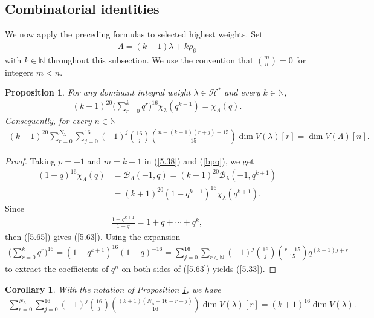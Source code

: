 \documentclass[12pt]{article}
\numberwithin{equation}{section}
\newtheorem{corollary}[theorem]{Corollary}
\newtheorem{proposition}[theorem]{Proposition}
\theoremstyle{definition}
\theoremstyle{remark}
\begin{document}
\subsection{Combinatorial identities}
We now apply the preceding formulas to selected highest weights. Set
\begin{eqnarray}
	\Lambda=(k+1)\lambda+k\rho_6
\end{eqnarray}
with $k\in\mathbb{N}$ throughout this subsection. We use the convention that $\binom{m}{n}=0$ for integers $m<n$.
\begin{proposition}\label{prop5.6}
	For any dominant integral weight $\lambda\in \mathscr{H}^*$ and every $k\in\mathbb{N}$, 
	\begin{eqnarray}
		(k+1)^{20}\big(\sum_{r=0}^kq^r\big)^{16}\chi_\lambda(q^{k+1})=\chi_{\Lambda}(q).\label{5.63}
	\end{eqnarray}
	Consequently, for every $n\in\mathbb{N}$
	\begin{align}
		(k+1)^{20}\sum_{r=0}^{N_{\lambda}}\sum\limits_{j=0}^{16}(-1)^j\binom{16}{j}\binom{n-(k+1)(r+j)+15}{15}\dim V(\lambda)[r]=\dim V(\Lambda)[n].\label{5.33}
	\end{align}
\end{proposition}
\begin{proof}
	Taking $p=-1$ and $m=k+1$ in (\ref{5.38}) and (\ref{bpq}), we get
	\begin{align}
		(1-q)^{16}\chi_{\Lambda}(q)&=\mathcal{B}_{\Lambda}(-1,q)=(k+1)^{20}\mathcal{B}_{\lambda}(-1,q^{k+1})\nonumber\\
		&=(k+1)^{20}(1-q^{k+1})^{16}\chi_{\lambda}(q^{k+1}).\label{5.65}
	\end{align}
	Since 
	\begin{eqnarray}
		\frac{1-q^{k+1}}{1-q}=1+q+\cdots +q^k,
	\end{eqnarray}
	then (\ref{5.65}) gives (\ref{5.63}). Using the expansion
	\begin{align}
		\big(\sum_{r=0}^{k}q^r\big)^{16}=(1-q^{k+1})^{16}(1-q)^{-16}=\sum_{j=0}^{16}\sum_{r\in\mathbb{N}}(-1)^{j}\binom{16}{j}\binom{r+15}{15}q^{(k+1)j+r}
	\end{align}
	to extract the coefficients of $q^n$ on both sides of (\ref{5.63}) yields (\ref{5.33}).
\end{proof}
\begin{corollary}\label{Cor5.9}
	With the notation of Proposition \ref{prop5.6}, we have
	\begin{align}
		\sum_{r=0}^{N_\lambda}\sum_{j=0}^{16}(-1)^j\binom{16}{j}\binom{(k+1)(N_\lambda+16-r-j)}{16}\dim V(\lambda)[r]=(k+1)^{16}\dim V(\lambda).\label{5.36}
	\end{align}
\end{corollary}
\end{document}
